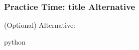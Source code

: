 \begin{{frame}}[fragile]
    \frametitle{{Practice Time: {title} Alternative}}

    (Optional) Alternative:
    \begin{{minted}}{{python}}
    \end{{minted}}
\end{{frame}}
